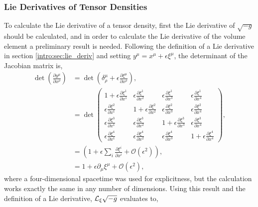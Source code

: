 \subsubsection{Lie Derivatives of Tensor Densities}
To calculate the Lie derivative of a tensor density, first the Lie derivative of $\sqrt{-g}$ should be calculated, and in order to calculate the Lie derivative of the volume element a preliminary result is needed. Following the definition of a Lie derivative in section \ref{intro:sec:lie_deriv} and setting $y^\mu = x^\mu + \epsilon \xi^\mu$, the determinant of the Jacobian matrix is,
\begin{align}
 \det\left(\frac{\partial y^\mu}{\partial x^\rho}\right)
&= \det\left(\delta^\mu_\rho + \epsilon \frac{\partial \xi^\mu}{\partial x^\rho}\right) ,\\[7pt]
&= \det\begin{pmatrix}
1+\epsilon\frac{\partial \xi^1}{\partial x^1}& \epsilon\frac{\partial \xi^1}{\partial x^2}& \epsilon\frac{\partial \xi^1}{\partial x^3}& \epsilon\frac{\partial \xi^1}{\partial x^4}\\[7pt]
\epsilon\frac{\partial \xi^2}{\partial x^1}& 1+\epsilon\frac{\partial \xi^2}{\partial x^2}& \epsilon\frac{\partial \xi^2}{\partial x^3}& \epsilon\frac{\partial \xi^2}{\partial x^4}\\[7pt]
\epsilon\frac{\partial \xi^3}{\partial x^1}& \epsilon\frac{\partial \xi^3}{\partial x^2}& 1+\epsilon\frac{\partial \xi^3}{\partial x^3}& \epsilon\frac{\partial \xi^3}{\partial x^4}\\[7pt]
\epsilon\frac{\partial \xi^4}{\partial x^1}&\epsilon\frac{\partial \xi^4}{\partial x^2} & \epsilon\frac{\partial \xi^4}{\partial x^3}& 1+\epsilon\frac{\partial \xi^4}{\partial x^4}\end{pmatrix} ,\\[7pt]
&=\left(1 + \epsilon \sum_i \frac{\partial \xi^i}{\partial x^i} + \mathcal{O}(\epsilon^2)\right) ,\\[7pt]
&=1 + \epsilon \partial_\mu \xi^\mu + \mathcal{O}(\epsilon^2),
\end{align}
where a four-dimensional spacetime was used for explicitness, but the calculation works exactly the same in any number of dimensions. Using this result and the definition of a Lie derivative, $\mathcal{L}_\xi \sqrt{-g}$ evaluates to,
